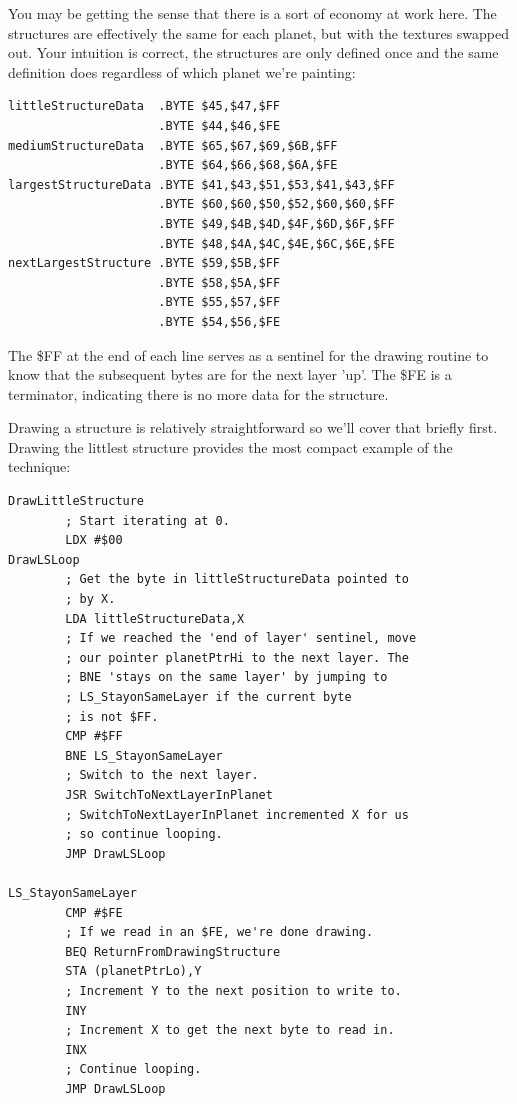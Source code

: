 You may be getting the sense that there is a sort of economy at work here. The structures are effectively
the same for each planet, but with the textures swapped out. Your intuition is correct, the structures
are only defined once and the same definition does regardless of which planet we're painting:

\begin{lstlisting}[caption=The definitions of three of the structures above\, each of which serves all five planets.]
littleStructureData  .BYTE $45,$47,$FF
                     .BYTE $44,$46,$FE
mediumStructureData  .BYTE $65,$67,$69,$6B,$FF
                     .BYTE $64,$66,$68,$6A,$FE
largestStructureData .BYTE $41,$43,$51,$53,$41,$43,$FF
                     .BYTE $60,$60,$50,$52,$60,$60,$FF
                     .BYTE $49,$4B,$4D,$4F,$6D,$6F,$FF
                     .BYTE $48,$4A,$4C,$4E,$6C,$6E,$FE
nextLargestStructure .BYTE $59,$5B,$FF
                     .BYTE $58,$5A,$FF
                     .BYTE $55,$57,$FF
                     .BYTE $54,$56,$FE
\end{lstlisting}

The \$FF at the end of each line serves as a sentinel for the drawing routine to know that the subsequent bytes
are for the next layer 'up'. The \$FE is a terminator, indicating there is no more data for the structure.

Drawing a structure is relatively straightforward so we'll cover that briefly first. Drawing the littlest
structure provides the most compact example of the technique:

\begin{lstlisting}[caption=The littlest structure has only two layers.]
DrawLittleStructure
        ; Start iterating at 0.
        LDX #$00
DrawLSLoop
        ; Get the byte in littleStructureData pointed to
        ; by X.
        LDA littleStructureData,X
        ; If we reached the 'end of layer' sentinel, move
        ; our pointer planetPtrHi to the next layer. The
        ; BNE 'stays on the same layer' by jumping to
        ; LS_StayonSameLayer if the current byte
        ; is not $FF.
        CMP #$FF
        BNE LS_StayonSameLayer
        ; Switch to the next layer.
        JSR SwitchToNextLayerInPlanet
        ; SwitchToNextLayerInPlanet incremented X for us
        ; so continue looping.
        JMP DrawLSLoop

LS_StayonSameLayer   
        CMP #$FE
        ; If we read in an $FE, we're done drawing.
        BEQ ReturnFromDrawingStructure
        STA (planetPtrLo),Y
        ; Increment Y to the next position to write to.
        INY
        ; Increment X to get the next byte to read in.
        INX
        ; Continue looping.
        JMP DrawLSLoop
\end{lstlisting}

